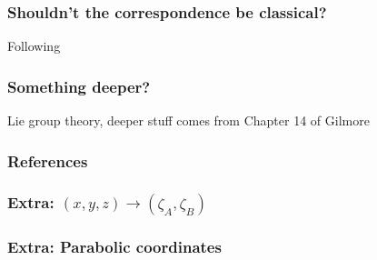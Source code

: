 \documentclass{beamer}
\theoremstyle{definition}
\begin{document}
\begin{frame}
\frametitle{Shouldn't the correspondence be classical?}


Following \cite{chen1987coulomb}
\end{frame}



\begin{frame}
\frametitle{Something deeper?}

Lie group theory, deeper stuff comes from Chapter 14 of Gilmore \cite{gilmore2008lie}

\end{frame}






\begin{frame}[allowframebreaks]
	\frametitle{References}
	\fontsize{7pt}{8pt}\selectfont
	
 	
	
\end{frame}


\begin{frame}
	\frametitle{Extra: $(x,y,z) \to (\zeta_A, \zeta_B)$} 

\end{frame}


\begin{frame}
	\frametitle{Extra: Parabolic coordinates}

\end{frame}
\end{document}
